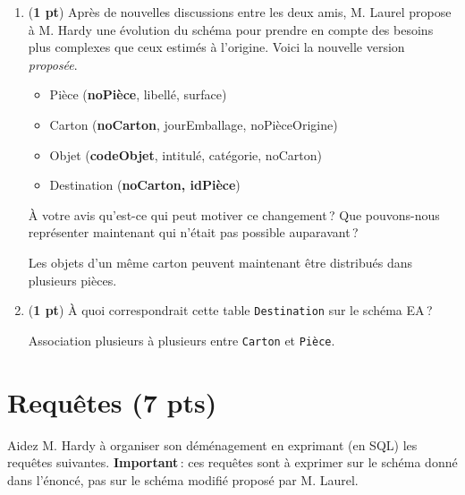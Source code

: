 \begin{enumerate}
\begin{solution}
Une pièce peut être la destination de plusieurs
cartons. Et les cardinalités sont inversées entre Pièce et Carton.
De même un
objet est contenu dans un seul carton.
\end{solution}

 \item ({\bf 1 pt}) Après de nouvelles discussions entre les deux amis, M. Laurel
        propose à M. Hardy une évolution du schéma pour prendre en compte
        des besoins plus complexes que ceux estimés à l'origine. Voici
        la nouvelle version \emph{proposée}.

      \begin{itemize}
        \item Pièce (\textbf{noPièce}, libellé, surface)
        \item Carton (\textbf{noCarton}, jourEmballage, noPièceOrigine)
        \item  Objet (\textbf{codeObjet}, intitulé, catégorie,
                     noCarton)
        \item Destination (\textbf{noCarton, idPièce})
       \end{itemize}
  À votre avis qu'est-ce qui peut motiver ce changement\,? Que pouvons-nous
 représenter maintenant qui n'était pas possible auparavant\,?

\begin{solution}
 Les objets d'un même carton peuvent maintenant être distribués dans plusieurs pièces.
\end{solution}


 \item ({\bf 1 pt}) À quoi correspondrait cette table \texttt{Destination} sur le schéma
 EA\,?

\begin{solution}
Association plusieurs à plusieurs entre \texttt{Carton} et \texttt{Pièce}.
\end{solution}
\end{enumerate}

\section{Requêtes (7 pts)}

Aidez M. Hardy à organiser son déménagement en
exprimant (en SQL) les requêtes suivantes. \textbf{Important}\,: ces requêtes sont à exprimer
sur le schéma donné dans l'énoncé, pas sur le schéma modifié proposé par M. Laurel.

